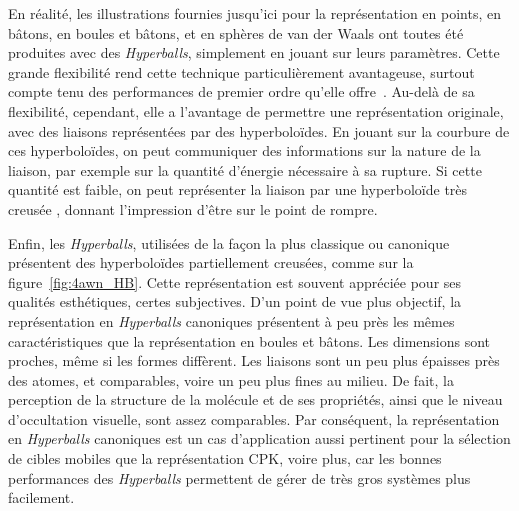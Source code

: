 \begin{appendices}
	En réalité, les illustrations fournies jusqu'ici pour la représentation en points, en bâtons, en boules et bâtons, et en sphères de van der Waals ont toutes été produites avec des \emph{Hyperballs}, simplement en jouant sur leurs paramètres. Cette grande flexibilité rend cette technique particulièrement avantageuse, surtout compte tenu des performances de premier ordre qu'elle offre~\cite{chavent2011gpu}. Au-delà de sa flexibilité, cependant, elle a l'avantage de permettre une représentation originale, avec des liaisons représentées par des hyperboloïdes. En jouant sur la courbure de ces hyperboloïdes, on peut communiquer des informations sur la nature de la liaison, par exemple sur la quantité d'énergie nécessaire à sa rupture. Si cette quantité est faible, on peut représenter la liaison par une hyperboloïde très \og creusée \fg{}, donnant l'impression d'être sur le point de rompre.
		
	Enfin, les \emph{Hyperballs}, utilisées de la façon la plus \og classique \fg{} ou \og canonique \fg{} présentent des hyperboloïdes partiellement creusées, comme sur la figure~\ref{fig:4awn_HB}. Cette représentation est souvent appréciée pour ses qualités esthétiques, certes subjectives. D'un point de vue plus objectif, la représentation en \emph{Hyperballs} canoniques présentent à peu près les mêmes caractéristiques que la représentation en boules et bâtons. Les dimensions sont proches, même si les formes diffèrent. Les liaisons sont un peu plus épaisses près des atomes, et comparables, voire un peu plus fines au milieu. De fait, la perception de la structure de la molécule et de ses propriétés, ainsi que le niveau d'occultation visuelle, sont assez comparables. Par conséquent, la représentation en \emph{Hyperballs} canoniques est un cas d'application aussi pertinent pour la sélection de cibles mobiles que la représentation CPK, voire plus, car les bonnes performances des \emph{Hyperballs} permettent de gérer de très gros systèmes plus facilement.
	

\end{appendices}
